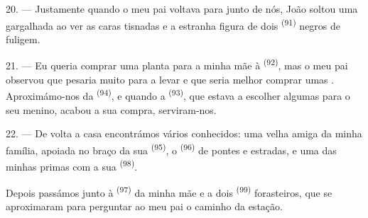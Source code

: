 20. --- Justamente quando o meu pai voltava para junto de nós, João soltou
uma gargalhada ao ver as caras tisnadas e a estranha figura de dois
 \textsuperscript{(91)} negros de fuligem.

21. --- Eu queria comprar uma planta para a minha mãe à 
\textsuperscript{(92)}, mas o meu pai observou que pesaria muito para a levar e
que seria melhor comprar umas . Aproximámo-nos da
 \textsuperscript{(94)}, e quando a 
\textsuperscript{(93)}, que estava a escolher algumas para o seu menino, acabou a
sua compra, serviram-nos.

22. --- De volta a casa encontrámos vários conhecidos: uma velha amiga da
minha família, apoiada no braço da sua 
\textsuperscript{(95)}, o  \textsuperscript{(96)} de pontes e estradas,
e uma das minhas primas com a sua  \textsuperscript{(98)}.

Depois passámos junto à  \textsuperscript{(97)} da minha mãe e a
dois  \textsuperscript{(99)} forasteiros, que se aproximaram para
perguntar ao meu pai o caminho da estação.
\VUsaut{6.0mm}
\VUfilet{22mm}
